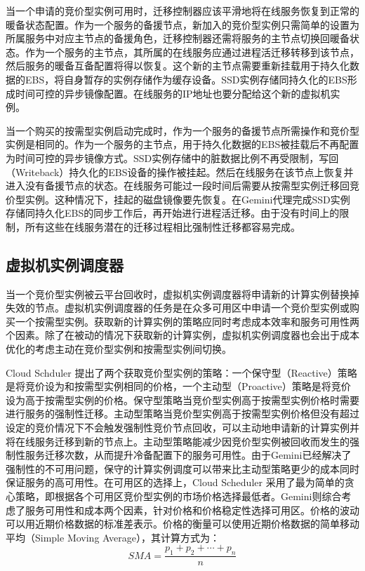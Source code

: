 当一个申请的竞价型实例可用时，迁移控制器应该平滑地将在线服务恢复到正常的暖备状态配置。作为一个服务的备援节点，新加入的竞价型实例只需简单的设置为所属服务中对应主节点的备援角色，迁移控制器还需将服务的主节点切换回暖备状态。作为一个服务的主节点，其所属的在线服务应通过进程活迁移转移到该节点，然后服务的暖备互备配置将得以恢复。这个新的主节点需要重新挂载用于持久化数据的EBS，将自身暂存的实例存储作为缓存设备。SSD实例存储同持久化的EBS形成时间可控的异步镜像配置。在线服务的IP地址也要分配给这个新的虚拟机实例。

当一个购买的按需型实例启动完成时，作为一个服务的备援节点所需操作和竞价型实例是相同的。作为一个服务的主节点，用于持久化数据的EBS被挂载后不再配置为时间可控的异步镜像方式。SSD实例存储中的脏数据比例不再受限制，写回（Writeback）持久化的EBS设备的操作被挂起。然后在线服务在该节点上恢复并进入没有备援节点的状态。在线服务可能过一段时间后需要从按需型实例迁移回竞价型实例。这种情况下，挂起的磁盘镜像要先恢复。在Gemini代理完成SSD实例存储同持久化EBS的同步工作后，再开始进行进程活迁移。由于没有时间上的限制，所有这些在线服务潜在的迁移过程相比强制性迁移都容易完成。

\subsection{虚拟机实例调度器}
当一个竞价型实例被云平台回收时，虚拟机实例调度器将申请新的计算实例替换掉失效的节点。虚拟机实例调度器的任务是在众多可用区中申请一个竞价型实例或购买一个按需型实例。获取新的计算实例的策略应同时考虑成本效率和服务可用性两个因素。除了在被动的情况下获取新的计算实例，虚拟机实例调度器也会出于成本优化的考虑主动在竞价型实例和按需型实例间切换。

Cloud Schduler \cite{He:2015:CCH:2749246.2749275} 提出了两个获取竞价型实例的策略：一个保守型（Reactive）策略是将竞价设为和按需型实例相同的价格，一个主动型（Proactive）策略是将竞价设为高于按需型实例的价格。保守型策略当竞价型实例高于按需型实例价格时需要进行服务的强制性迁移。主动型策略当竞价型实例高于按需型实例价格但没有超过设定的竞价情况下不会触发强制性竞价节点回收，可以主动地申请新的计算实例并将在线服务迁移到新的节点上。主动型策略能减少因竞价型实例被回收而发生的强制性服务迁移次数，从而提升冷备配置下的服务可用性。由于Gemini已经解决了强制性的不可用问题，保守的计算实例调度可以带来比主动型策略更少的成本同时保证服务的高可用性。在可用区的选择上，Cloud Scheduler 采用了最为简单的贪心策略，即根据各个可用区竞价型实例的市场价格选择最低者。Gemini则综合考虑了服务可用性和成本两个因素，针对价格和价格稳定性选择可用区。价格的波动可以用近期价格数据的标准差表示。价格的衡量可以使用近期价格数据的简单移动平均（Simple Moving Average），其计算方式为：
\begin{equation}
SMA = \frac{p_1 + p_2 + \cdots + p_n}{n}
\end{equation}

